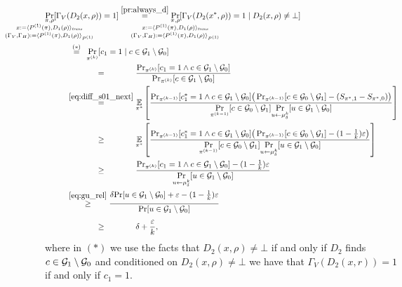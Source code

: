 \begin{align*}
\underset{
  \mathclap{
  \substack{\pi, \rho \\ x := \langle P^{(1)}(\pi), D_1(\rho) \rangle_{\trans}
    \\ (\Gamma_V, \Gamma_H) := \langle P^{(1)}(\pi), D_1 (\rho) \rangle_{P^{(1)}} }}}
{\Pr}[\Gamma_V&(D_2(x,\rho)) = 1]
  \overset{\eqref{pr:always_d}}{=}
\underset{
  \mathclap{
  \substack{\pi, \rho \\ x := \langle P^{(1)}(\pi), D_1(\rho) \rangle_{\trans}
    \\ (\Gamma_V, \Gamma_H) := \langle P^{(1)}(\pi), D_1 (\rho) \rangle_{P^{(1)}} }}}
{\Pr}[\Gamma_V(D_2(x^*,\rho)) = 1 \mid D_2(x,\rho) \neq \bot] \\
  &\overset{\hphantom{a}(*)\hphantom{a}}{=} \underset{\pi^{(k)}}{\Pr}[c_1 = 1 \mid c \in \cG_1 \setminus \cG_0] \\
  &\overset{\hphantom{\eqref{eq:diff_s01_next}}}{=} \frac{\Pr_{\pi^{(k)}}[c_1 = 1 \land c \in \cG_1 \setminus \cG_0]}{\Pr_{\pi^{(k)}}[c \in \cG_1 \setminus \cG_0]} \\
  &\overset{\eqref{eq:diff_s01_next}}{=} \underset{\pi^*}{\mathbb{E}}\left[\frac{\Pr_{\pi^{(k-1)}}[c_1^* = 1 \land c \in \cG_1 \setminus \cG_0]
    \big(\Pr_{\pi^{(k-1)}}[c \in \cG_0 \setminus \cG_1] - (S_{\pi^*,1} - S_{\pi^*,0})\big)}
  {\underset{\pi^{(k-1)}}{\Pr}[c \in \cG_0 \setminus \cG_1] \underset{u \leftarrow \mu_{\delta}^{k}}{\Pr}[u \in \cG_1 \setminus \cG_0]}\right]  \\
  &\overset{\hphantom{\eqref{eq:diff_s01_next}}}{\geq} \underset{\pi^*}{\mathbb{E}}\left[\frac{\Pr_{\pi^{(k-1)}}[c_1^* = 1 \land c \in \cG_1 \setminus \cG_0]
    \big(\Pr_{\pi^{(k-1)}}[c \in \cG_0 \setminus \cG_1] - (1 - \frac{1}{k})\epsilon\big)}
  {\underset{\pi^{(k-1)}}{\Pr}[c \in \cG_0 \setminus \cG_1] \underset{u \leftarrow \mu_{\delta}^{k}}{\Pr}[u \in \cG_1 \setminus \cG_0]}\right]  \\
  &\overset{\hphantom{\eqref{eq:diff_s01_next}}}{\geq} \frac{\Pr_{\pi^{(k)}}[c_1 = 1 \land c \in \cG_1 \setminus \cG_0] -
    (1 - \frac{1}{k})\epsilon}{\underset{u \leftarrow \mu_{\delta}^{k}}{\Pr}[u \in \cG_1 \setminus \cG_0]} \\
  &\overset{\eqref{eq:gu_rel}}{\geq} \frac{\delta \underset{}{\Pr}[u \in \cG_1 \setminus \cG_0] + \epsilon - (1-\frac{1}{k})\epsilon}{\underset{}{\Pr}[u \in \cG_1 \setminus \cG_0]} \\
  &\overset{\hphantom{\eqref{eq:diff_s01_next}}}{\geq} \delta + \frac{\epsilon}{k},
\end{align*}
where in $(*)$ we use the facts that $D_2(x,\rho) \neq \bot$ if and only if $D_2$ finds $c \in \mathcal{G}_1 \setminus \mathcal{G}_0$
and conditioned on $D_2(x,\rho) \neq \bot$  we have that $\Gamma_V(D_2(x,r)) = 1$ if and only if $c_1 = 1$.